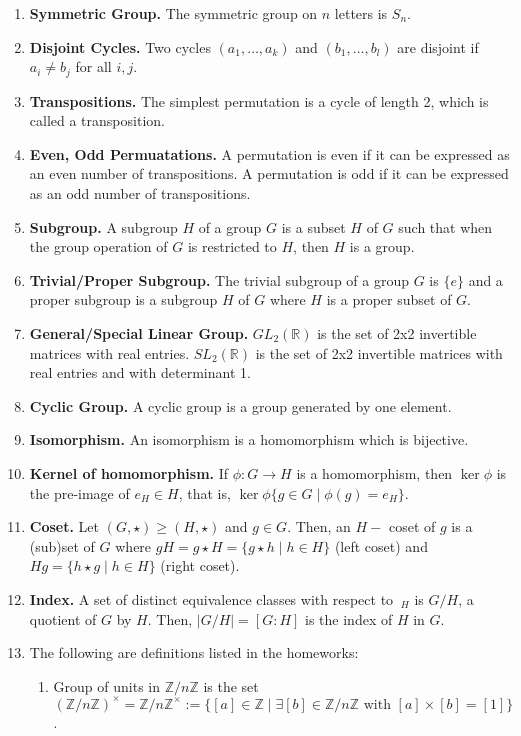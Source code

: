 \begin{enumerate}
	\item \textbf{Symmetric Group. } The symmetric group on $n$ letters is $S_n$. 
	\item \textbf{Disjoint Cycles. } Two cycles $(a_1,\dots,a_k)$ and $(b_1,\dots,b_l)$ are disjoint if $a_i \neq b_j$ for all $i,j$. 
	\item \textbf{Transpositions. } The simplest permutation is a cycle of length 2, which is called a transposition. 
	\item \textbf{Even, Odd Permuatations. } A permutation is even if it can be expressed as an even number of transpositions. A permutation is odd if it can be expressed as an odd number of transpositions. 
	\item \textbf{Subgroup. } A subgroup $H$ of a group $G$ is a subset $H$ of $G$ such that when the group operation of $G$ is restricted to $H$, then $H$ is a group. 
	\item \textbf{Trivial/Proper Subgroup. } The trivial subgroup of a group $G$ is $\{e\}$ and a proper subgroup is a subgroup $H$ of $G$ where $H$ is a proper subset of $G$. 
	\item \textbf{General/Special Linear Group. } $GL_2(\mathbb{R})$ is the set of 2x2 invertible matrices with real entries. $SL_2(\mathbb{R})$ is the set of 2x2 invertible matrices with real entries and with determinant 1.
	\item \textbf{Cyclic Group. } A cyclic group is a group generated by one element. 
	\item \textbf{Isomorphism. } An isomorphism is a homomorphism which is bijective. 
	\item \textbf{Kernel of homomorphism. } If $\phi: G \to H$ is a homomorphism, then $\ker \phi$ is the pre-image of $e_H \in H$, that is, $\ker \phi \{g \in G \mid \phi(g)=e_H\}$.
	\item \textbf{Coset. } Let $(G,\star) \geq (H,\star)$ and $g \in G$. Then, an $H-$ coset of $g$ is a (sub)set of $G$ where $gH = g \star H = \{g \star h \mid h \in H\}$ (left coset) and $Hg = \{h \star g \mid h \in H\}$ (right coset). 
	\item \textbf{Index. } A set of distinct equivalence classes with respect to $~_H$ is $G/H$, a quotient of $G$ by $H$. Then, $|G/H| = [G:H]$ is the index of $H$ in $G$. 
	\item The following are definitions listed in the homeworks: 
	\begin{enumerate}
		\item Group of units in $\mathbb{Z}/n\mathbb{Z}$ is the set $(\mathbb{Z}/n\mathbb{Z})^\times = \mathbb{Z}/n\mathbb{Z}^\times := \{[a] \in \mathbb{Z} \mid \exists [b] \in \mathbb{Z}/n\mathbb{Z} \textrm{ with } [a] \times [b] = [1]\}$. 

\end{enumerate}
\end{enumerate}
